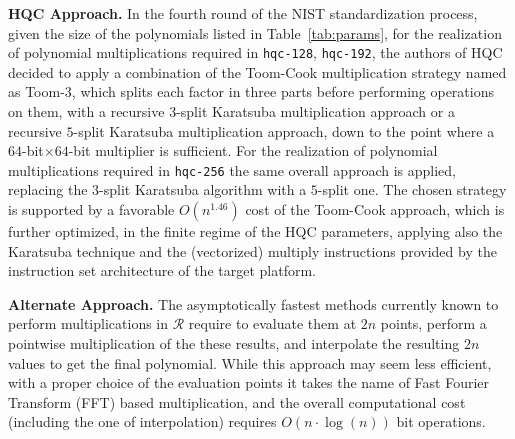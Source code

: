 \noindent
\textbf{HQC Approach.}
In the fourth round of the NIST standardization process, given the size of the 
polynomials listed in Table~\ref{tab:params}, for the realization of polynomial 
multiplications required in \texttt{hqc-128}, \texttt{hqc-192}, the authors of 
HQC decided to apply a combination of the Toom-Cook multiplication strategy 
named as Toom-$3$, which splits each factor in three parts before performing 
operations on them, with a recursive $3$-split Karatsuba multiplication approach 
or a recursive $5$-split Karatsuba multiplication approach, down to the point 
where a $64$-bit$ \times 64$-bit multiplier is sufficient. 
For the realization of polynomial multiplications required in \texttt{hqc-256} 
the same overall approach is applied, replacing the $3$-split Karatsuba 
algorithm with a $5$-split one. The chosen strategy is supported by a favorable 
$O(n^{1.46})$ cost of the Toom-Cook approach, which is further optimized, in 
the finite regime of the HQC parameters, applying also the Karatsuba technique 
and the (vectorized) multiply instructions provided by the instruction set 
architecture of the target platform.
 
\noindent
\textbf{Alternate Approach.}
The asymptotically fastest methods currently known to perform multiplications in 
$\mathcal{R}$ require to evaluate them at $2n$ points, perform a pointwise 
multiplication of the these results, and interpolate the resulting $2n$ values 
to get the final polynomial. While this approach may seem less efficient, 
with a proper choice of the evaluation points it takes the name of 
Fast Fourier Transform (FFT) based multiplication, and the overall 
computational cost (including the one of interpolation) requires 
${O}(n\cdot\log(n))$ bit operations.

